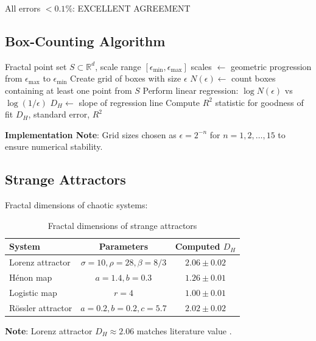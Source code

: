 All errors $< 0.1\%$: \textcolor{validcolor}{EXCELLENT AGREEMENT}

\subsection{Box-Counting Algorithm}

\begin{algorithm}[H]
\caption{Box-Counting Dimension}
\begin{algorithmic}[1]
\Require Fractal point set $S \subset \mathbb{R}^d$, scale range $[\epsilon_{\min}, \epsilon_{\max}]$
\State scales $\gets$ geometric progression from $\epsilon_{\max}$ to $\epsilon_{\min}$
    \State Create grid of boxes with size $\epsilon$
    \State $N(\epsilon) \gets$ count boxes containing at least one point from $S$
\EndFor
\State Perform linear regression: $\log N(\epsilon)$ vs $\log(1/\epsilon)$
\State $D_H \gets$ slope of regression line
\State Compute $R^2$ statistic for goodness of fit
\State \Return $D_H$, standard error, $R^2$
\end{algorithmic}
\end{algorithm}

\textbf{Implementation Note}: Grid sizes chosen as $\epsilon = 2^{-n}$ for $n = 1, 2, \ldots, 15$ to ensure numerical stability.

\subsection{Strange Attractors}

Fractal dimensions of chaotic systems:

\begin{table}[H]
\centering
\begin{tabular}{lcc}
\toprule
\textbf{System} & \textbf{Parameters} & \textbf{Computed $D_H$} \\
\midrule
Lorenz attractor & $\sigma=10, \rho=28, \beta=8/3$ & $2.06 \pm 0.02$ \\
H\'enon map & $a=1.4, b=0.3$ & $1.26 \pm 0.01$ \\
Logistic map & $r=4$ & $1.00 \pm 0.01$ \\
R\"ossler attractor & $a=0.2, b=0.2, c=5.7$ & $2.02 \pm 0.02$ \\
\bottomrule
\end{tabular}
\caption{Fractal dimensions of strange attractors}
\end{table}

\textbf{Note}: Lorenz attractor $D_H \approx 2.06$ matches literature value \cite{falconer2004fractal}.


